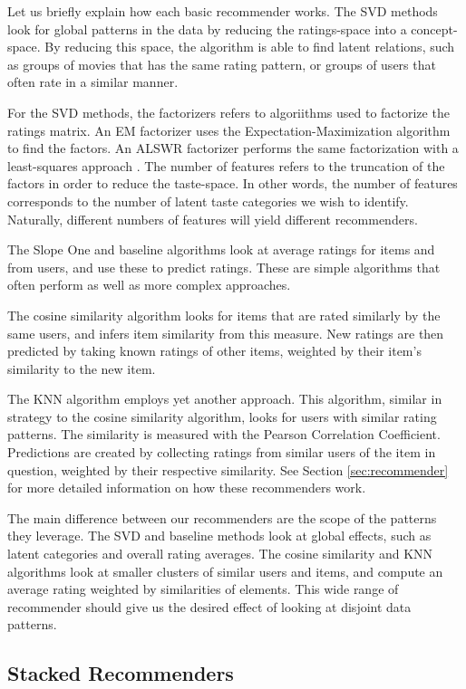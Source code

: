 Let us briefly explain how each basic recommender works.
The SVD methods look for global patterns in the data 
by reducing the ratings-space into a concept-space.
By reducing this space, the algorithm is able to find
latent relations, such as groups of movies that has the same
rating pattern, or groups of users that often rate in a similar manner.

For the SVD methods, the factorizers refers to algoriithms used to factorize the ratings matrix.
An EM factorizer uses the Expectation-Maximization algorithm to find the factors.
An ALSWR factorizer performs the same factorization with a least-squares approach \citep{Zhou2008}.
The number of features refers to the truncation of the factors in order to reduce the taste-space.
In other words, the number of features corresponds to the number of latent taste categories
we wish to identify.
Naturally, different numbers of features will yield different recommenders.

The Slope One and baseline algorithms look at average
ratings for items and from users, and use these to predict ratings.
These are simple algorithms that often perform as well
as more complex approaches.

The cosine similarity algorithm looks for items that are rated
similarly by the same users, and infers item similarity from this measure.
New ratings are then predicted by taking known ratings of other items,
weighted by their item's similarity to the new item.

The KNN algorithm employs yet another approach. This algorithm,
similar in strategy to the cosine similarity algorithm,
looks for users with similar rating patterns.
The similarity is measured with the Pearson Correlation Coefficient.
Predictions are created by collecting ratings from similar users
of the item in question, weighted by their respective similarity.
See Section \ref{sec:recommender} for more 
detailed information on how these recommenders work. 

The main difference between our recommenders are the scope of the patterns they leverage.
The SVD and baseline methods look at global effects, such as latent categories
and overall rating averages.
The cosine similarity and KNN algorithms look at smaller clusters of similar
users and items, and compute an average rating weighted by 
similarities of elements.
This wide range of recommender should give us the desired
effect of looking at disjoint data patterns.


\subsection{Stacked Recommenders}

